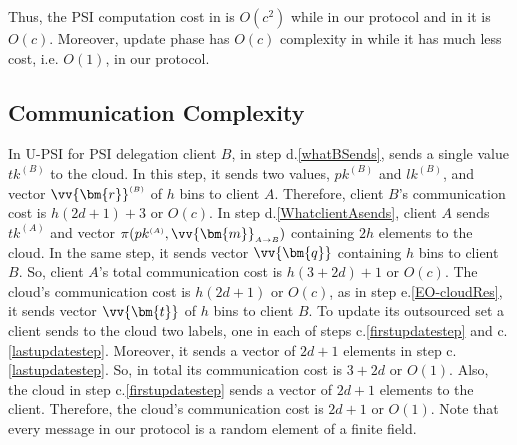 Thus, the PSI computation cost in \cite{opsi15,DBLP:conf/fc/AbadiTD16,yang2018improved} is $O(c^{\scriptscriptstyle 2})$ while in our protocol and in \cite{eopsi} it is  $O(c)$. Moreover, update phase has $O(c)$ complexity in  \cite{opsi15,DBLP:conf/fc/AbadiTD16,yang2018improved,eopsi} while it has  much less cost, i.e. $O(1)$, in our protocol. 

\vspace{-3mm}

\subsection{Communication Complexity} \label{commcomp}

In U-PSI for PSI delegation client $B$, in step d.\ref{whatBSends}, sends a single value $tk^{\scriptscriptstyle (B)}$ to the cloud. In this step, it sends two  values, $pk^{\scriptscriptstyle (B)}$ and $lk^{\scriptscriptstyle (B)}$, and vector $\vv{\bm{r}}^{\scriptscriptstyle (B)}$ of $h$ bins to client $A$. Therefore, client $B$'s communication cost is $h(2d+1)+3$ or $O(c)$. In step d.\ref{WhatclientAsends}, client $A$ sends $tk^{\scriptscriptstyle (A)}$ and vector $\pi(pk^{\scriptscriptstyle (A)},\vv{\bm{m}}_{\scriptscriptstyle A \rightarrow B})$ containing $2h$ elements to the cloud. In the same step, it sends vector $\vv{\bm{q}}$ containing $h$ bins to client $B$. So, client $A$'s total communication cost  is $h(3+2d)+1$ or $O(c)$. The cloud's communication cost is $h(2d+1)$ or $O(c)$, as in step e.\ref{EO-cloudRes}, it sends vector $\vv{\bm{t}}$ of $h$ bins to client $B$. 
To update its outsourced set a client sends to the cloud two labels, one in each of steps c.\ref{firstupdatestep} and c.\ref{lastupdatestep}. Moreover, it sends a vector of $2d+1$ elements in step c.\ref{lastupdatestep}. So, in total its communication cost is $3+2d$ or $O(1)$. Also, the cloud in step c.\ref{firstupdatestep} sends a vector of $2d+1$ elements to the client. Therefore,  the cloud's communication cost is $2d+1$ or $O(1)$. Note that  every message in our protocol is a random element of a finite field.


